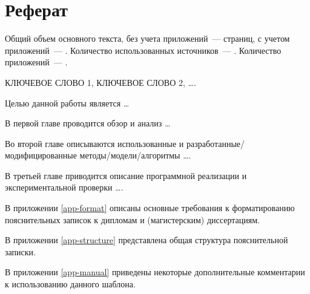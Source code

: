 \chapter*{Реферат}
\thispagestyle{plain}

Общий объем основного текста, без учета приложений~---
\pageref{end_of_main_text} страниц, с учетом приложений~---
\pageref{end_of_document}. Количество использованных источников~---
\hyperref[sec:bibliography]{}. Количество приложений~--- 
\hyperref[sec:appendices]{}.

\noindent \uppercase{ключевое слово 1, ключевое слово 2, \dots .}

Целью данной работы является \dots

В первой главе проводится обзор и анализ \dots

Во второй главе описываются использованные и разработанные/модифицированные методы/модели/алгоритмы \dots.

В третьей главе приводится описание программной реализации и экспериментальной проверки \dots.

В приложении \ref{app-format} описаны основные требования к форматированию пояснительных записок к дипломам и (магистерским) диссертациям.

В приложении \ref{app-structure} представлена общая структура пояснительной записки.

В приложении \ref{app-manual} приведены некоторые дополнительные комментарии к использованию данного шаблона.
